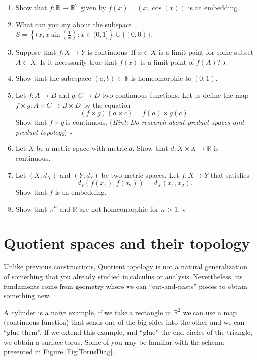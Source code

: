 \documentclass[
	fontsize=10pt, %
	twoside=false, %
	secnumdepth=1, %
]{kaobook}
\begin{document}
\begin{enumerate}
\item Show that $f:\mathbb{R}\to \mathbb{R}^2$ given by $f(x)=(x,\cos(x))$ is an embedding.

\item What can you say about the subspace $S=\left\{(x,x\sin\left(\frac{1}{x}\right): x\in (0,1]\right\}\cup\{(0,0)\}.$

\item Suppose that $f:X\to Y$ is continuous. If $x\in X$ is a limit point for some subset $A\subset X.$ Is it necessarily true that $f(x)$ is a limit point of $f(A)$? $\star$

\item Show that the subespace $(a,b)\subset \mathbb{R}$ is homeomorphic to $(0,1).$

\item Let $f:A\to B$ and $g:C\to D$ two continuous functions. Let us define the map $f\times g:A\times C \to B\times D$ by the equation $$(f\times g)(a\times c)=f(a)\times g(c).$$ Show that $f\times g$ is continuous. (\textit{Hint: Do research about product spaces and product topology}) $\star$

\item Let $X$ be a metric space with metric $d.$ Show that $d:X\times X\to \mathbb{R}$ is continuous.

\item Let $(X,d_X)$ and $(Y,d_Y)$ be two metric spaces. Let $f:X\to Y$ that satisfies $$d_Y(f(x_1),f(x_2))=d_X(x_1,x_2).$$ Show that $f$ is an embedding. 

\item Show that $\mathbb{R}^n$ and $\mathbb{R}$ are not homeomorphic for $n>1.$ $\star$

\end{enumerate}

\section{Quotient spaces and their topology}

Unlike previous constructions, Quotient topology is not a natural generalization of something that you already studied in calculus or analysis. Nevertheless, its fundaments come from geometry where we can ``cut-and-paste'' pieces to obtain something new. 

A cylinder is a naive example, if we take a rectangle in $\mathbb{R}^2$ we can use a map (continuous function) that sends one of the big sides into the other and we can ``glue them''.  If we extend this example, and ``glue'' the end circles of the triangle, we obtain a surface torus. Some of you may be familiar with the schema presented in Figure \ref{Fig:TorusDiag}.
\end{document}
